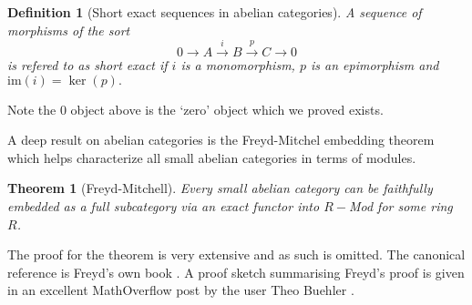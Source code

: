 \documentclass[12pt]{report}
\numberwithin{equation}{section}
\newtheorem{theorem}[dummy]{Theorem}
\newtheorem{definition}[dummy]{Definition}
\begin{document}
	\begin{definition}[Short exact sequences in abelian categories]
		A sequence of morphisms of the sort \[ 0 \to A \xrightarrow{i} B \xrightarrow{p} C \to 0 \] is refered to as short exact if \( i \) is a monomorphism, \( p \) is an epimorphism and \( \mathrm{im}(i)=\ker(p). \)
	\end{definition}
	
	Note the \( 0 \) object above is the `zero' object which we proved exists.
	
	
	A deep result on abelian categories is the Freyd-Mitchel embedding theorem which helps characterize all small abelian categories in terms of modules.
	
	\begin{theorem}[Freyd-Mitchell]
		Every small abelian category can be faithfully embedded as a full subcategory via an exact functor into $R-$Mod for some ring $R$.
	\end{theorem}
	The proof for the theorem is very extensive and as such is omitted. The canonical reference is Freyd's own book \cite{freyd1964abelian}. A proof sketch summarising Freyd's proof is given in an excellent MathOverflow post by the user Theo Buehler \cite{47762}.
	
\end{document}
